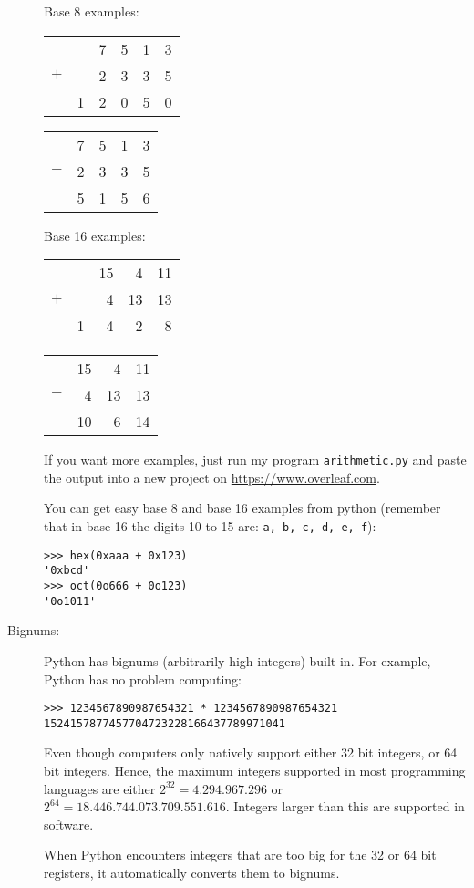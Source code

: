\documentclass{article}
\begin{document}
\begin{description}
Base 8 examples:\hfill
\begin{tabular}{rrrrrr}
  &  &7 &5 &1 &3\\
$+$ &  &2 &3 &3 &5\\
\hline
  &1 &2 &0 &5 &0\\
\end{tabular}\hfill
\begin{tabular}{rrrrr}
  &7 &5 &1 &3\\
$-$ &2 &3 &3 &5\\
\hline
  &5 &1 &5 &6\\
\end{tabular}

Base 16 examples:\hfill
\begin{tabular}{rrrrr}
  &  &15 &4 &11\\
$+$ &  &4 &13 &13\\
\hline
  &1 &4 &2 &8\\
\end{tabular}\hfill
\begin{tabular}{rrrr}
  &15 &4 &11\\
$-$ &4 &13 &13\\
\hline
  &10 &6 &14\\
\end{tabular}

If you want more examples, just run my program {\tt arithmetic.py}
and paste the output into a new project on \url{https://www.overleaf.com}.

You can get easy base 8 and base 16 examples from python (remember that
in base 16 the digits 10 to 15 are: {\tt a, b, c, d, e, f}):
\begin{lstlisting}
>>> hex(0xaaa + 0x123)
'0xbcd'
>>> oct(0o666 + 0o123)
'0o1011'
\end{lstlisting}

\item[Bignums:]  Python has bignums (arbitrarily high integers) built in.  For example, Python
has no problem computing:
\begin{lstlisting}
>>> 1234567890987654321 * 1234567890987654321
1524157877457704723228166437789971041
\end{lstlisting}
Even though computers only natively support either 32 bit integers, or 64
bit integers.  Hence, the maximum integers supported in most programming
languages are either $2^{32} = 4.294.967.296$ or  $2^{64} = 18.446.744.073.709.551.616$.
Integers larger than this are supported in software.

When Python encounters integers that are too big for the 32 or 64 bit
registers, it automatically converts them to bignums.  


\end{description}
\end{document}

